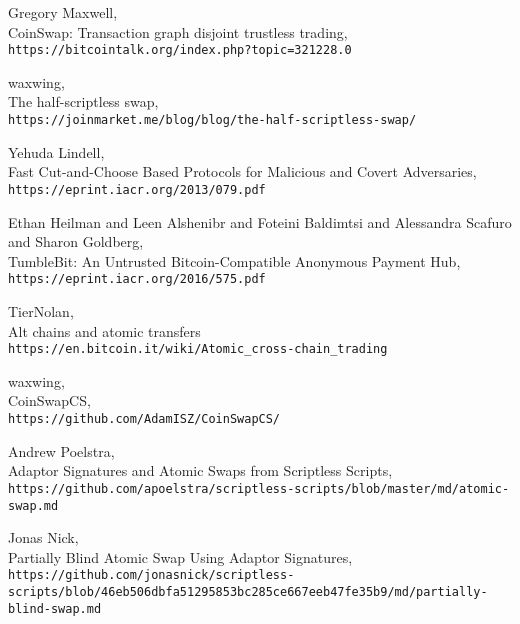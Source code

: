 \documentclass[12pt,a4paper]{article}
\begin{document}
\begin{tiny}
\begin{thebibliography}{9}
  Gregory Maxwell, \\
  CoinSwap: Transaction graph disjoint trustless trading, \\
  \texttt{https://bitcointalk.org/index.php?topic=321228.0}

  waxwing, \\
  The half-scriptless swap, \\
  \texttt{https://joinmarket.me/blog/blog/the-half-scriptless-swap/}

  Yehuda Lindell, \\
  Fast Cut-and-Choose Based Protocols for Malicious and Covert Adversaries, \\
  \texttt{https://eprint.iacr.org/2013/079.pdf}

  Ethan Heilman and Leen Alshenibr and Foteini Baldimtsi and Alessandra Scafuro and Sharon Goldberg, \\
  TumbleBit: An Untrusted Bitcoin-Compatible Anonymous Payment Hub, \\
  \texttt{https://eprint.iacr.org/2016/575.pdf}

  TierNolan, \\
  Alt chains and atomic transfers \\
  \texttt{https://en.bitcoin.it/wiki/Atomic\_cross-chain\_trading}

  waxwing, \\
  CoinSwapCS, \\
  \texttt{https://github.com/AdamISZ/CoinSwapCS/}

  Andrew Poelstra, \\
  Adaptor Signatures and Atomic Swaps from Scriptless Scripts, \\
  \texttt{https://github.com/apoelstra/scriptless-scripts/blob/master/md/atomic-swap.md}

  Jonas Nick, \\
  Partially Blind Atomic Swap Using Adaptor Signatures, \\
  \texttt{https://github.com/jonasnick/scriptless-scripts/blob/46eb506dbfa51295853bc285ce667eeb47fe35b9/md/partially-blind-swap.md}
\end{thebibliography}
\end{tiny}
\end{document}
